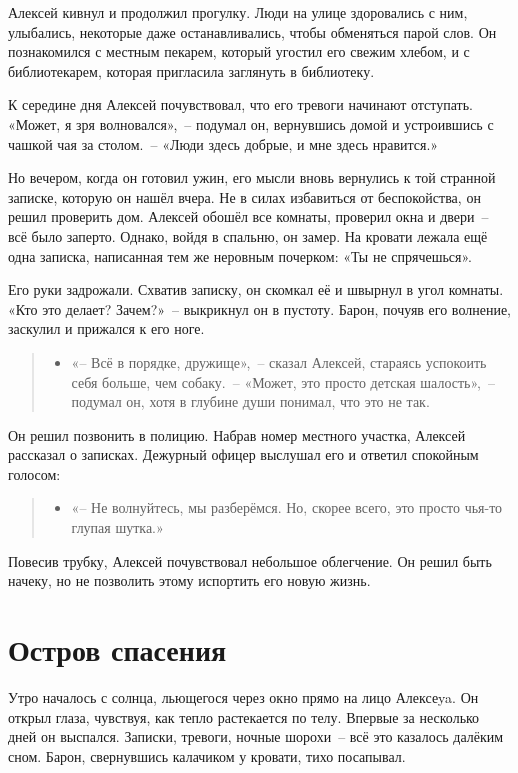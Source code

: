 \documentclass[12pt,a4paper]{book}
\newenvironment{dialogue}{\begin{quote}\itshape\begin{itemize}\item[]}{\end{itemize}\end{quote}}
\begin{document}
Алексей кивнул и продолжил прогулку. Люди на улице здоровались с ним, улыбались, некоторые даже останавливались, чтобы обменяться парой слов. Он познакомился с местным пекарем, который угостил его свежим хлебом, и с библиотекарем, которая пригласила заглянуть в библиотеку.

К середине дня Алексей почувствовал, что его тревоги начинают отступать. «Может, я зря волновался»,~-- подумал он, вернувшись домой и устроившись с чашкой чая за столом.~-- «Люди здесь добрые, и мне здесь нравится.»

Но вечером, когда он готовил ужин, его мысли вновь вернулись к той странной записке, которую он нашёл вчера. Не в силах избавиться от беспокойства, он решил проверить дом. Алексей обошёл все комнаты, проверил окна и двери~-- всё было заперто. Однако, войдя в спальню, он замер. На кровати лежала ещё одна записка, написанная тем же неровным почерком: «Ты не спрячешься».

Его руки задрожали. Схватив записку, он скомкал её и швырнул в угол комнаты. «Кто это делает? Зачем?»~-- выкрикнул он в пустоту. Барон, почуяв его волнение, заскулил и прижался к его ноге.

\begin{dialogue}
«-- Всё в порядке, дружище»,~-- сказал Алексей, стараясь успокоить себя больше, чем собаку.~-- «Может, это просто детская шалость»,~-- подумал он, хотя в глубине души понимал, что это не так.
\end{dialogue}

Он решил позвонить в полицию. Набрав номер местного участка, Алексей рассказал о записках. Дежурный офицер выслушал его и ответил спокойным голосом:

\begin{dialogue}
«-- Не волнуйтесь, мы разберёмся. Но, скорее всего, это просто чья-то глупая шутка.»
\end{dialogue}

Повесив трубку, Алексей почувствовал небольшое облегчение. Он решил быть начеку, но не позволить этому испортить его новую жизнь.

\chapter{Остров спасения}

Утро началось с солнца, льющегося через окно прямо на лицо Алексеya. Он открыл глаза, чувствуя, как тепло растекается по телу. Впервые за несколько дней он выспался. Записки, тревоги, ночные шорохи~-- всё это казалось далёким сном. Барон, свернувшись калачиком у кровати, тихо посапывал.
\end{document}
